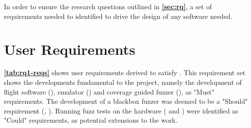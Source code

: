 \documentclass[../report.tex]{subfiles}
\begin{document}
In order to ensure the research questions outlined in \textbf{\autoref{sec:rq}}, a set of requirements needed to identified to drive the
design of any software needed.

\section{User Requirements} \label{sec:user-req}

\textbf{\autoref{tab:rq1-reqs}} shows user requirements derived to satisfy
. This requirement set shows the developments fundamental to the
project, namely the development of flight software (), emulator
() and coverage guided fuzzer (), as "Must"
requirements. The development of a blackbox fuzzer was deemed to be a "Should"
requirement (, ). Running fuzz tests on the
hardware ( and ) were identified as "Could"
requirements, as potential extensions to the work.
\end{document}
